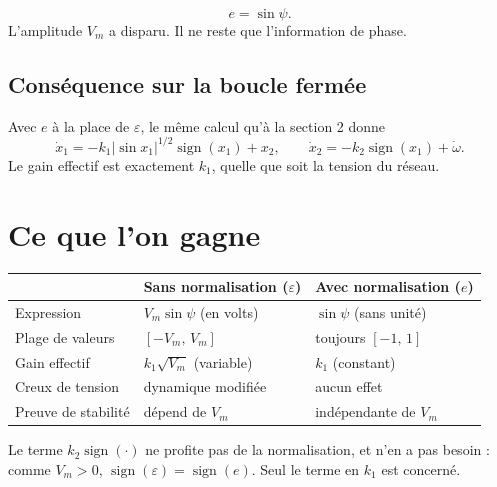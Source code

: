 \documentclass[11pt,a4paper]{article}
\numberwithin{equation}{section}
\newcommand{\sign}{\operatorname{sign}}
\begin{document}
\begin{resultat}
\begin{equation}
e = \sin\psi .
\end{equation}
L'amplitude $V_m$ a disparu. Il ne reste que l'information de phase.
\end{resultat}

\subsection{Conséquence sur la boucle fermée}
Avec $e$ à la place de $\varepsilon$, le même calcul qu'à la section 2 donne
\begin{equation}
\dot x_1 = -k_1|\sin x_1|^{1/2}\sign(x_1) + x_2,\qquad \dot x_2 = -k_2\sign(x_1)+\dot\omega .
\end{equation}
Le gain effectif est exactement $k_1$, quelle que soit la tension du réseau.

\section{Ce que l'on gagne}

\begin{center}
\renewcommand{\arraystretch}{1.35}
\begin{tabular}{lll}
\toprule
 & \textbf{Sans normalisation ($\varepsilon$)} & \textbf{Avec normalisation ($e$)} \\
\midrule
Expression & $V_m\sin\psi$ (en volts) & $\sin\psi$ (sans unité) \\
Plage de valeurs & $[-V_m,\,V_m]$ & toujours $[-1,\,1]$ \\
Gain effectif & $k_1\sqrt{V_m}$ (variable) & $k_1$ (constant) \\
Creux de tension & dynamique modifiée & aucun effet \\
Preuve de stabilité & dépend de $V_m$ & indépendante de $V_m$ \\
\bottomrule
\end{tabular}
\end{center}

\begin{idee}
Le terme $k_2\sign(\cdot)$ ne profite pas de la normalisation, et n'en a pas besoin :
comme $V_m>0$, $\sign(\varepsilon)=\sign(e)$. Seul le terme en $k_1$ est concerné.
\end{idee}
\end{document}
